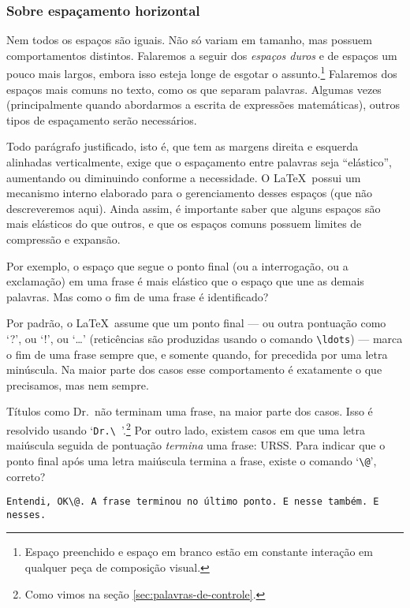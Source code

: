 \begin{comment}
  (breve) história do TeX, do LaTeX e irmãos
  Resumo de como o sistema ``monta'' as páginas
\end{comment}


\subsubsection{Sobre espaçamento horizontal}\label{sec:espacos}

Nem todos os espaços são iguais. Não só variam em tamanho, mas possuem
comportamentos distintos. Falaremos a seguir dos 
\emph{espaços duros}
e de espaços um pouco mais largos, embora isso esteja longe de esgotar
o assunto.\footnote{Espaço preenchido e espaço em branco estão em
  constante interação em qualquer peça de composição visual.} Falaremos dos espaços mais comuns no texto, como os que separam palavras. Algumas vezes (principalmente quando abordarmos a escrita de expressões matemáticas), outros tipos de espaçamento serão necessários. 

Todo parágrafo justificado, isto é, que tem as margens direita e
esquerda alinhadas verticalmente, exige que o espaçamento entre palavras seja ``elástico'',
aumentando ou diminuindo conforme a necessidade. O \LaTeX\ possui um
mecanismo interno elaborado para o gerenciamento desses espaços (que não descreveremos aqui). Ainda
assim, é importante saber que alguns espaços são mais elásticos do que
outros, e que os espaços comuns possuem limites de compressão e
expansão.

Por exemplo, o espaço que segue o ponto final (ou a interrogação, ou a exclamação) em uma frase é mais
elástico que o espaço que une as demais palavras. Mas como o fim de
uma frase é identificado?

Por padrão, o \LaTeX\ assume que um ponto final --- ou outra pontuação
como `?{}', ou `!{}', ou `\ldots'
(reticências são produzidas usando o
comando \verb'\ldots') --- marca o fim de uma
frase sempre que, e somente quando, for precedida por uma letra
minúscula. Na maior parte dos casos esse comportamento é exatamente o
que precisamos, mas nem sempre.

Títulos como Dr.\ não terminam uma frase, na maior parte dos
casos. Isso é resolvido usando `\verb*'Dr.\ ''.\footnote{Como vimos na seção \ref{sec:palavras-de-controle}.}
Por outro lado, existem casos em que uma letra maiúscula seguida de
pontuação \emph{termina} uma frase: URSS\@. Para indicar que o ponto
final após uma letra maiúscula termina a frase, existe o comando `\verb'\@'\thinspace', correto?
\begin{center}\footnotesize
\verb'Entendi, OK\@. A frase terminou no último ponto. E nesse também. E nesses.'
\end{center}

